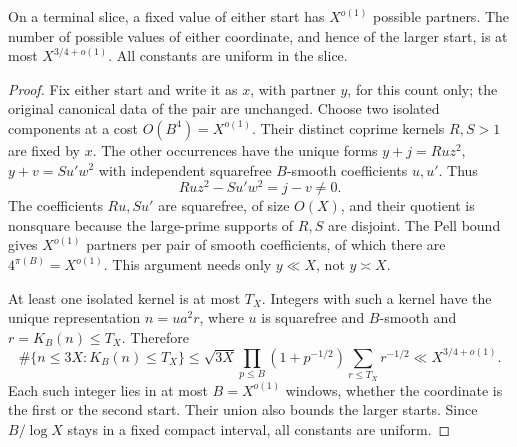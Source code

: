 \begin{lemma}\label{lem:terminal-partners}
On a terminal slice, a fixed value of either start has $X^{o(1)}$
possible partners. The number of possible values of either coordinate,
and hence of the larger start, is at most $X^{3/4+o(1)}$.
All constants are uniform in the slice.
\end{lemma}
\begin{proof}
Fix either start and write it as $x$, with partner $y$, for this count
only; the original canonical data of the pair are unchanged.
Choose two isolated components at a cost $O(B^4)=X^{o(1)}$.
Their distinct coprime kernels $R,S>1$ are fixed by $x$. The other
occurrences have the unique forms
$y+j=Ruz^2$, $y+v=Su'w^2$ with independent squarefree $B$-smooth
coefficients $u,u'$.
Thus
\[
 Ruz^2-Su'w^2=j-v\ne0.
\]
The coefficients $Ru,Su'$ are squarefree, of size $O(X)$, and their
quotient is nonsquare because the large-prime supports of $R,S$ are
disjoint. The Pell bound gives $X^{o(1)}$ partners per pair of smooth
coefficients, of which there are $4^{\pi(B)}=X^{o(1)}$.
This argument needs only $y\ll X$, not $y\asymp X$.

At least one isolated kernel is at most $T_X$. Integers with such a
kernel have the unique representation $n=ua^2r$, where $u$ is squarefree
and $B$-smooth and $r=K_B(n)\le T_X$. Therefore
\begin{equation}\label{eq:kernel-container}
 \#\{n\le3X:K_B(n)\le T_X\}
 \le\sqrt{3X}\prod_{p\le B}(1+p^{-1/2})\sum_{r\le T_X}r^{-1/2}
 \ll X^{3/4+o(1)}.
\end{equation}
Each such integer lies in at most $B=X^{o(1)}$ windows, whether the
coordinate is the first or the second start. Their union also bounds the
larger starts. Since
$B/\log X$ stays in a fixed compact interval, all constants are uniform.
\end{proof}

